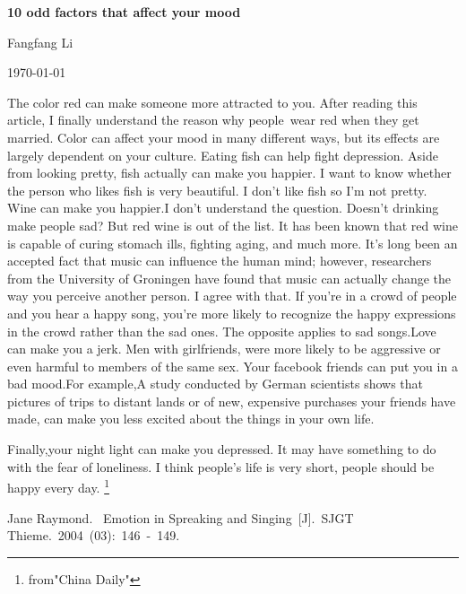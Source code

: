 \documentclass{article}
\begin{document}
\begin{center}
{\bfseries \LARGE 10 odd factors that affect your mood}
\end{center}
\begin{center}
Fangfang Li
\end{center}
\begin{center}
\today
\end{center}
\par The color red can make someone more attracted to you. After reading this article, I finally understand the reason why people wear red when they get married. Color can affect your mood in many different ways, but its effects are largely dependent on your culture. Eating fish can help fight depression. Aside from looking pretty, fish actually can make you happier. I want to know whether the person who likes fish is very beautiful. I don't like fish so I'm not pretty. Wine can make you happier.I don't understand the question. Doesn't drinking make people sad? But red wine is out of the list. It has been known that red wine is capable of curing stomach ills, fighting aging, and much more. It’s long been an accepted fact that music can influence the human mind; however, researchers from the University of Groningen have found that music can actually change the way you perceive another person. I agree with that. If you’re in a crowd of people and you hear a happy song, you’re more likely to recognize the happy expressions in the crowd rather than the sad ones. The opposite applies to sad songs.Love can make you a jerk. Men with girlfriends, were more likely to be aggressive or even harmful to members of the same sex. Your facebook friends can put you in a bad mood.For example,A study conducted by German scientists shows that pictures of trips to distant lands or of new, expensive purchases your friends have made, can make you less excited about the things in your own life.
\par Finally,your night light can make you depressed. It may have something to do with the fear of loneliness. I think people's life is very short, people should be happy every day.
\footnote{from"China Daily"}
\begin{thebibliography}{99}
 Jane Raymond.~
Emotion in Spreaking and Singing~[J].~SJGT Thieme.~2004~(03):~146~-~149.

\end{thebibliography}
\end{document}
